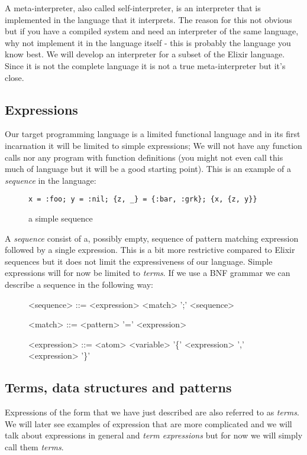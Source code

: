 \documentclass[a4paper,11pt]{article}
\begin{document}
A meta-interpreter, also called self-interpreter, is an interpreter
that is implemented in the language that it interprets. The reason for
this not obvious but if you have a compiled system and need an
interpreter of the same language, why not implement it in the language
itself - this is probably the language you know best. We will develop
an interpreter for a subset of the Elixir language. Since it is not the
complete language it is not a true meta-interpreter but it's close.

\subsection{Expressions}
Our target programming language is a limited functional language and
in its first incarnation it will be limited to simple expressions; We
will not have any function calls nor any program with function
definitions (you might not even call this much of language but it will
be a good starting point). This is an example of a {\em sequence} in
the language:

\begin{figure}[h]
\begin{verbatim}
x = :foo; y = :nil; {z, _} = {:bar, :grk}; {x, {z, y}}
\end{verbatim}
\caption{a simple sequence}
\label{fig:sequence}
\end{figure}

A {\em sequence} consist of a, possibly empty, sequence of pattern
matching expression followed by a single expression. This is a bit
more restrictive compared to Elixir sequences but it does not limit
the expressiveness of our language. Simple expressions will for now be
limited to {\em terms}. If we use a BNF grammar we can describe a
sequence in the following way:

\begin{figure}[h]
\begin{grammar}
<sequence> ::= <expression> \alt <match> ';' <sequence>

<match> ::= <pattern> '=' <expression> 

<expression> ::= <atom> \alt <variable> \alt '\{' <expression> ',' <expression> '\}'
\end{grammar}
\end{figure}

\subsection{Terms, data structures and patterns}
Expressions of the form that we have just described are also referred
to as {\em terms}. We will later see examples of expression that are
more complicated and we will talk about expressions in general and
{\em term expressions} but for now we will simply call them {\em terms}.
\end{document}
